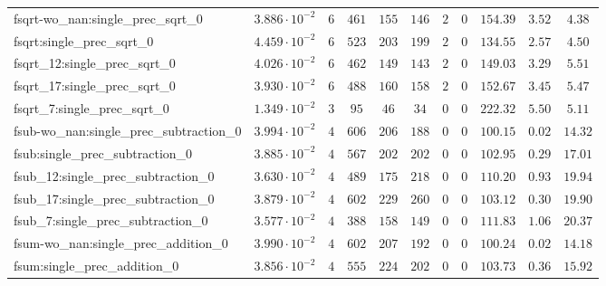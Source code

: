 \begin{tabular}{|l|c|c|c|c|c|c|c|c|c|c|}
fsqrt-wo\_nan:single\_prec\_sqrt\_0            & $ 3.886 \cdot 10^{-2} $ & $ 6      $ & $ 461    $ & $ 155   $ & $ 146   $ & $ 2   $ & $ 0 $ & $ 154.39      $ & $ 3.52    $ & $ 4.38    $ \\
fsqrt:single\_prec\_sqrt\_0                    & $ 4.459 \cdot 10^{-2} $ & $ 6      $ & $ 523    $ & $ 203   $ & $ 199   $ & $ 2   $ & $ 0 $ & $ 134.55      $ & $ 2.57    $ & $ 4.50    $ \\
fsqrt\_12:single\_prec\_sqrt\_0                & $ 4.026 \cdot 10^{-2} $ & $ 6      $ & $ 462    $ & $ 149   $ & $ 143   $ & $ 2   $ & $ 0 $ & $ 149.03      $ & $ 3.29    $ & $ 5.51    $ \\
fsqrt\_17:single\_prec\_sqrt\_0                & $ 3.930 \cdot 10^{-2} $ & $ 6      $ & $ 488    $ & $ 160   $ & $ 158   $ & $ 2   $ & $ 0 $ & $ 152.67      $ & $ 3.45    $ & $ 5.47    $ \\
fsqrt\_7:single\_prec\_sqrt\_0                 & $ 1.349 \cdot 10^{-2} $ & $ 3      $ & $ 95     $ & $ 46    $ & $ 34    $ & $ 0   $ & $ 0 $ & $ 222.32      $ & $ 5.50    $ & $ 5.11    $ \\
fsub-wo\_nan:single\_prec\_subtraction\_0      & $ 3.994 \cdot 10^{-2} $ & $ 4      $ & $ 606    $ & $ 206   $ & $ 188   $ & $ 0   $ & $ 0 $ & $ 100.15      $ & $ 0.02    $ & $ 14.32   $ \\
fsub:single\_prec\_subtraction\_0              & $ 3.885 \cdot 10^{-2} $ & $ 4      $ & $ 567    $ & $ 202   $ & $ 202   $ & $ 0   $ & $ 0 $ & $ 102.95      $ & $ 0.29    $ & $ 17.01   $ \\
fsub\_12:single\_prec\_subtraction\_0          & $ 3.630 \cdot 10^{-2} $ & $ 4      $ & $ 489    $ & $ 175   $ & $ 218   $ & $ 0   $ & $ 0 $ & $ 110.20      $ & $ 0.93    $ & $ 19.94   $ \\
fsub\_17:single\_prec\_subtraction\_0          & $ 3.879 \cdot 10^{-2} $ & $ 4      $ & $ 602    $ & $ 229   $ & $ 260   $ & $ 0   $ & $ 0 $ & $ 103.12      $ & $ 0.30    $ & $ 19.90   $ \\
fsub\_7:single\_prec\_subtraction\_0           & $ 3.577 \cdot 10^{-2} $ & $ 4      $ & $ 388    $ & $ 158   $ & $ 149   $ & $ 0   $ & $ 0 $ & $ 111.83      $ & $ 1.06    $ & $ 20.37   $ \\
fsum-wo\_nan:single\_prec\_addition\_0         & $ 3.990 \cdot 10^{-2} $ & $ 4      $ & $ 602    $ & $ 207   $ & $ 192   $ & $ 0   $ & $ 0 $ & $ 100.24      $ & $ 0.02    $ & $ 14.18   $ \\
fsum:single\_prec\_addition\_0                 & $ 3.856 \cdot 10^{-2} $ & $ 4      $ & $ 555    $ & $ 224   $ & $ 202   $ & $ 0   $ & $ 0 $ & $ 103.73      $ & $ 0.36    $ & $ 15.92   $ \\

\end{tabular}
